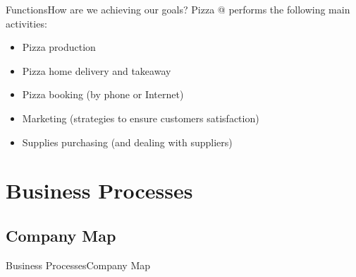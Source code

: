 \documentclass{beamer}
\begin{document}
\begin{frame}{Functions}{How are we achieving our goals?}
 Pizza @ performs the following main activities:
 \begin{itemize}
 \item Pizza production
 \item Pizza home delivery and takeaway
 \item Pizza booking (by phone or Internet)
 \item Marketing (strategies to ensure customers satisfaction)
 \item Supplies purchasing (and dealing with suppliers)
\end{itemize}
\end{frame}


\section{Business Processes}
\subsection{Company Map}
\begin{frame}{Business Processes}{Company Map}
\end{frame}
\end{document}
